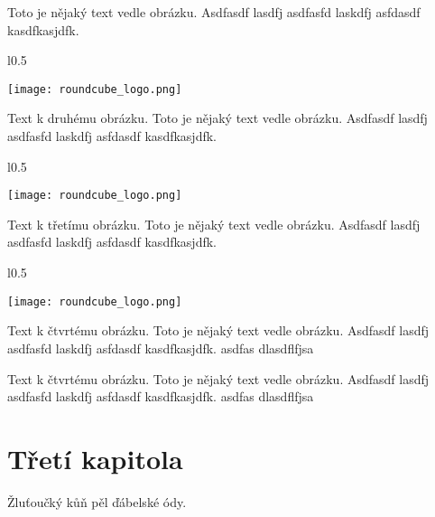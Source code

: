 \documentclass[12pt,a4paper,twoside]{book}
\begin{document}
Toto je nějaký text vedle obrázku. Asdfasdf lasdfj asdfasfd laskdfj asfdasdf kasdfkasjdfk.
\newline

\begin{wrapfigure}{l}{0.5\textwidth}
  \vspace{-20pt}
  \begin{center}
    \texttt{[image: roundcube\_logo.png]}
  \end{center}
  \vspace{-20pt}
\end{wrapfigure}

Text k druhému obrázku. Toto je nějaký text vedle obrázku. Asdfasdf lasdfj asdfasfd laskdfj asfdasdf kasdfkasjdfk.
\newline

\begin{wrapfigure}{l}{0.5\textwidth}
  \vspace{-20pt}
  \begin{center}
    \texttt{[image: roundcube\_logo.png]}
  \end{center}
  \vspace{-20pt}
\end{wrapfigure}

Text k třetímu obrázku. Toto je nějaký text vedle obrázku. Asdfasdf lasdfj asdfasfd laskdfj asfdasdf kasdfkasjdfk.
\newline

\begin{wrapfigure}{l}{0.5\textwidth}
  \vspace{-20pt}
  \begin{center}
    \texttt{[image: roundcube\_logo.png]}
  \end{center}
  \vspace{-20pt}
\end{wrapfigure}

Text k čtvrtému obrázku. Toto je nějaký text vedle obrázku. Asdfasdf lasdfj asdfasfd laskdfj asfdasdf kasdfkasjdfk.
\newline
asdfas dlasdflfjsa 

Text k čtvrtému obrázku. Toto je nějaký text vedle obrázku. Asdfasdf lasdfj asdfasfd laskdfj asfdasdf kasdfkasjdfk.
\newline
asdfas dlasdflfjsa 
\chapter{Třetí kapitola}
Žluťoučký kůň pěl ďábelské ódy.
\end{document}
